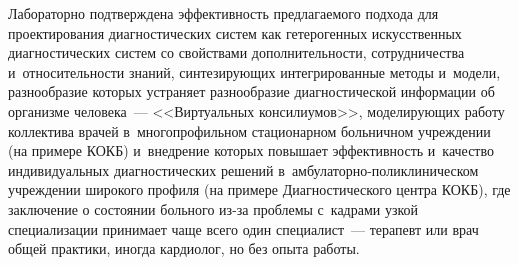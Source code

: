 \begin{multicols}{2}
  Лабораторно подтверждена эффективность предлагаемого подхода для проектирования 
диагностических систем как гетерогенных искусственных диагностических систем со 
свойствами дополнительности, сотрудничества и~относительности\linebreak
 знаний, синтезирующих 
интегрированные методы и~модели, разнообразие которых устраняет разнообразие 
диагностической информации об организме человека~--- <<Виртуальных консилиумов>>,\linebreak 
моделиру\-ющих работу коллектива врачей в~многопрофильном стационарном больничном 
учреждении (на примере КОКБ) и~внедрение 
которых повыша\-ет эффективность и~качество индивидуальных диагностических решений 
в~ам\-бу\-ла\-тор\-но-по\-ли\-кли\-ни\-че\-ском учреждении широкого профиля (на примере 
Диагностического центра КОКБ), где заключение о состоянии больного из-за проблемы 
с~кадрами узкой специализации принимает чаще всего один специалист~--- терапевт или 
врач общей практики, иногда кардиолог, но без опыта работы.


\end{multicols}
